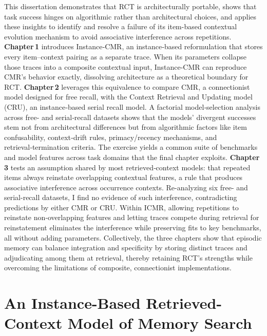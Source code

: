 \documentclass[
  letterpaper,
  11pt,
  english,
  singlespacing,
  headsepline]{MastersDoctoralThesis}
\begin{document}
This dissertation demonstrates that RCT is architecturally portable,
shows that task success hinges on algorithmic rather than architectural
choices, and applies these insights to identify and resolve a failure of
its item-based contextual evolution mechanism to avoid associative
interference across repetitions. \textbf{Chapter\,1} introduces
Instance‑CMR, an instance‑based reformulation that stores every
item--context pairing as a separate trace. When its parameters collapse
those traces into a composite contextual input, Instance-CMR can
reproduce CMR's behavior exactly, dissolving architecture as a
theoretical boundary for RCT. \textbf{Chapter\,2} leverages this
equivalence to compare CMR, a connectionist model designed for free
recall, with the Context Retrieval and Updating model (CRU), an
instance‑based serial recall model. A factorial model‑selection analysis
across free‑ and serial‑recall datasets shows that the models' divergent
successes stem not from architectural differences but from algorithmic
factors like item confusability, context‑drift rules, primacy/recency
mechanisms, and retrieval‑termination criteria. The exercise yields a
common suite of benchmarks and model features across task domains that
the final chapter exploits. \textbf{Chapter\,3} tests an assumption
shared by most retrieved‑context models: that repeated items always
reinstate overlapping contextual features, a rule that produces
associative interference across occurrence contexts. Re-analyzing six
free- and serial-recall datasets, I find no evidence of such
interference, contradicting predictions by either CMR or CRU. Within
ICMR, allowing repetitions to reinstate non‑overlapping features and
letting traces compete during retrieval for reinstatement eliminates the
interference while preserving fits to key benchmarks, all without adding
parameters. Collectively, the three chapters show that episodic memory
can balance integration and specificity by storing distinct traces and
adjudicating among them at retrieval, thereby retaining RCT's strengths
while overcoming the limitations of composite, connectionist
implementations.


\chapter{An Instance-Based Retrieved-Context Model of Memory
Search}\label{an-instance-based-retrieved-context-model-of-memory-search}
\end{document}
